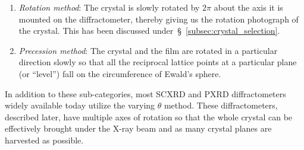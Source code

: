 \begin{itemize}
\begin{enumerate}
		    \item \textit{Rotation method}: The crystal is slowly rotated by $2\pi$ about the axis it is mounted on the diffractometer, thereby giving us the rotation photograph of the crystal. This has been discussed under~\S~\ref{subsec:crystal_selection}.
		    
		    \item \textit{Precession method}: The crystal and the film are rotated in a particular direction slowly so that all the reciprocal lattice points at a particular plane (or ``level'') fall on the circumference of Ewald's sphere.
		    
		\end{enumerate}
		
	In addition to these sub-categories, most SCXRD and PXRD diffractometers widely available today utilize the varying $\theta$ method. These diffractometers, described later, have multiple axes of rotation so that the whole crystal can be effectively brought under the X-ray beam and as many crystal planes are harvested as possible.
	    
	\end{itemize}